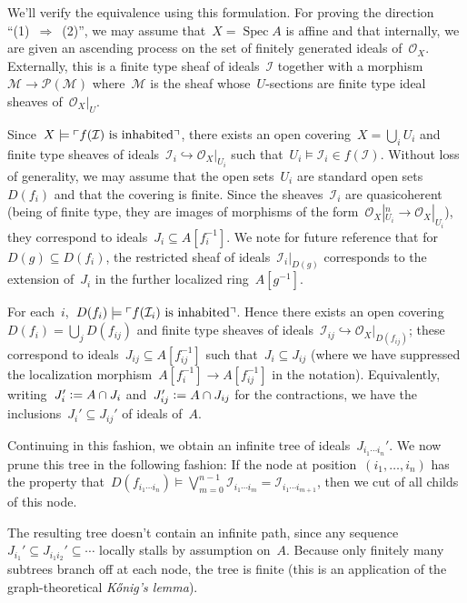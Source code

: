 \documentclass[10pt,reqno,a4paper]{amsbook}
\makeatletter
\theoremstyle{definition}
\theoremstyle{plain}
\theoremstyle{remark}
\let\acuteH\H
\newcommand{\konig}{K\acuteH onig}
\renewcommand{\H}{\mathcal{H}}
\renewcommand{\O}{\mathcal{O}}
\newcommand{\M}{\mathcal{M}}
\renewcommand{\P}{\mathcal{P}}
\newcommand{\I}{\mathcal{I}}
\DeclareMathOperator{\Spec}{Spec}
\newcommand{\?}{\,{:}\,}
\renewcommand{\_}{\mathpunct{.}\,}
\newcommand{\speak}[1]{\ulcorner\text{\textnormal{#1}}\urcorner}
\newcommand{\defeq}{\vcentcolon=}
\renewenvironment{proof}[1][\proofname]{\par
  \pushQED{\qed}%
  \normalfont \topsep6\p@\@plus6\p@\relax
  \trivlist
  \item[\hskip\labelsep
        \itshape
    #1\@addpunct{.}]\ignorespaces
}{%
  \popQED\endtrivlist\@endpefalse
}
\makeatother
\begin{document}
{\begin{proof}
%

We'll verify the equivalence using this formulation. For proving the
direction ``(1)~$\Rightarrow$~(2)'', we may assume that~$X =
\Spec A$ is affine and that internally, we are given an
ascending process on the set of finitely generated ideals of~$\O_X$.
Externally, this is a finite type sheaf of ideals~$\I$ together with a morphism~$\M
\to \P(\M)$ where~$\M$ is the sheaf whose~$U$-sections are finite type ideal
sheaves of~$\O_X|_U$.

Since~$X \models \speak{$f(\I)$ is inhabited}$, there exists an open covering~$X
= \bigcup_i U_i$ and finite type sheaves of ideals~$\I_i \hookrightarrow
\O_X|_{U_i}$ such that~$U_i \models \I_i \in f(\I)$. Without loss of generality,
we may assume that the open sets~$U_i$ are standard open sets~$D(f_i)$ and that
the covering is finite. Since the sheaves~$\I_i$ are quasicoherent (being of
finite type, they are images of morphisms of the form~$\O_X|_{U_i}^n \to
\O_X|_{U_i}$), they correspond to ideals~$J_i \subseteq A[f_i^{-1}]$. We note for future reference
that for~$D(g) \subseteq D(f_i)$, the restricted sheaf of ideals~$\I_i|_{D(g)}$
corresponds to the extension of~$J_i$ in the further
localized ring~$A[g^{-1}]$.

For each~$i$,~$D(f_i) \models \speak{$f(\I_i)$ is inhabited}$.
Hence there exists an open covering~$D(f_i) = \bigcup_j D(f_{ij})$ and finite
type sheaves of ideals~$\I_{ij} \hookrightarrow \O_X|_{D(f_{ij})}$; these
correspond to ideals~$J_{ij} \subseteq A[f_{ij}^{-1}]$ such that~$J_i
\subseteq J_{ij}$ (where we have suppressed the localization
morphism~$A[f_i^{-1}] \to A[f_{ij}^{-1}]$ in the notation). Equivalently,
writing~$J_i' \defeq A \cap J_i$ and~$J_{ij}' \defeq A \cap J_{ij}$ for the
contractions, we have the inclusions~$J_i' \subseteq J_{ij}'$ of ideals of~$A$.

Continuing in this fashion, we obtain an infinite tree of ideals~$J_{i_1 \cdots i_n}'$.
We now prune this tree in the following fashion: If the node at position~$(i_1,
\ldots, i_n)$ has the property that~$D(f_{i_1 \cdots i_n}) \models
\bigvee_{m=0}^{n-1} \I_{i_1 \cdots i_m} = \I_{i_1 \cdots i_{m+1}}$, then we cut
of all childs of this node.

The resulting tree doesn't contain an infinite path, since any
sequence~$J_{i_1}' \subseteq J_{i_1 i_2}' \subseteq \cdots$ locally stalls by
assumption on~$A$. Because only finitely many subtrees branch off at each node,
the tree is finite (this is an application of the graph-theoretical
\emph{\konig's lemma}).


\end{proof}}
\end{document}
